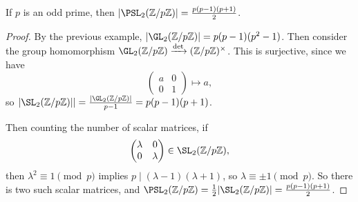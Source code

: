\documentclass[a4paper]{scrartcl}
\begin{document}
\begin{lemma}
	If $p$ is an odd prime, then $|\PSL_2(\mathbb{Z}/p\mathbb{Z})| = \frac{p(p - 1)(p + 1)}{2}$.
\end{lemma}
\begin{proof}
	By the previous example, $|\GL_2(\mathbb{Z}/p\mathbb{Z})| = p(p-1)(p^2 - 1)$. Then consider the group homomorphism $\GL_2(\mathbb{Z}/p\mathbb{Z}) \xrightarrow{\det} (\mathbb{Z}/p\mathbb{Z})^\times$. This is surjective, since we have
	$$
\begin{pmatrix}
	a & 0 \\
	0 & 1
\end{pmatrix} \longmapsto a,
	$$
	so $|\SL_2(\mathbb{Z}/p\mathbb{Z})|| = \frac{|\GL_2(\mathbb{Z}/p\mathbb{Z})|}{p - 1} = p(p - 1)(p + 1)$. 

	Then counting the number of scalar matrices, if
	$$
	\begin{pmatrix}
		\lambda & 0 \\ 0 & \lambda
	\end{pmatrix} \in \SL_2(\mathbb{Z}/p\mathbb{Z}),
	$$
	then $\lambda^2 \equiv 1\pmod{p}$ implies $p \mid (\lambda - 1)(\lambda + 1)$, so $\lambda \equiv \pm 1 \pmod{p}$. So there is two such scalar matrices, and $\PSL_2(\mathbb{Z}/p\mathbb{Z}) = \frac{1}{2}|\SL_2(\mathbb{Z}/p\mathbb{Z})| = \frac{p(p - 1)(p + 1)}{2}$.
\end{proof}
\end{document}
